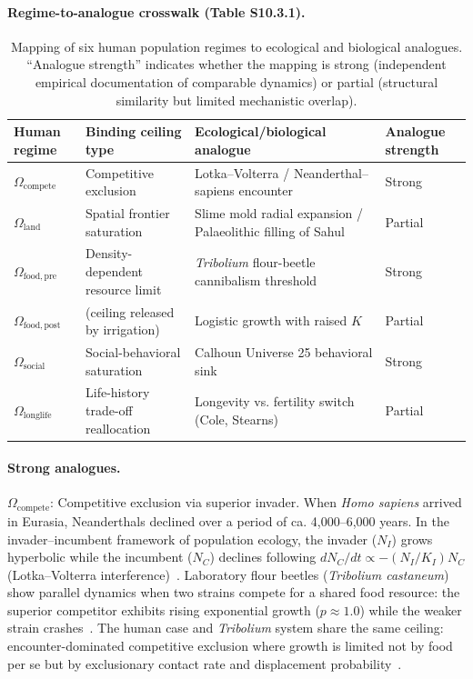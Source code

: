 \documentclass[11pt]{article}
\begin{document}
\paragraph{Regime-to-analogue crosswalk (Table S10.3.1).}
\begin{table}[H]
\centering
\caption{Mapping of six human population regimes to ecological and biological analogues. ``Analogue strength''
indicates whether the mapping is strong (independent empirical documentation of comparable dynamics) or
partial (structural similarity but limited mechanistic overlap).}
\label{tab:S10_analogues}
\begin{tabular}{llll}
\toprule
Human regime & Binding ceiling type & Ecological/biological analogue & Analogue strength \\
\midrule
$\Omega_{\mathrm{compete}}$ & Competitive exclusion & Lotka--Volterra / Neanderthal--sapiens encounter & Strong \\
$\Omega_{\mathrm{land}}$ & Spatial frontier saturation & Slime mold radial expansion / Palaeolithic filling of Sahul & Partial \\
$\Omega_{\mathrm{food,pre}}$ & Density-dependent resource limit & \textit{Tribolium} flour-beetle cannibalism threshold & Strong \\
$\Omega_{\mathrm{food,post}}$ & (ceiling released by irrigation) & Logistic growth with raised $K$ & Partial \\
$\Omega_{\mathrm{social}}$ & Social-behavioral saturation & Calhoun Universe 25 behavioral sink & Strong \\
$\Omega_{\mathrm{longlife}}$ & Life-history trade-off reallocation & Longevity vs. fertility switch (Cole, Stearns) & Partial \\
\bottomrule
\end{tabular}
\end{table}

\paragraph{Strong analogues.}

$\Omega_{\mathrm{compete}}$: Competitive exclusion via superior invader.
When \textit{Homo sapiens} arrived in Eurasia, Neanderthals declined over a period of ca. 4,000--6,000 years.
In the invader--incumbent framework of population ecology, the invader ($N_I$) grows hyperbolic while the incumbent
($N_C$) declines following $dN_C/dt \propto -(N_I/K_I)N_C$ (Lotka--Volterra interference)~\cite{currat2004,lotka1925,volterra1926}.
Laboratory flour beetles (\textit{Tribolium castaneum}) show parallel dynamics when two strains compete
for a shared food resource: the superior competitor exhibits rising exponential growth ($p \approx 1.0$) while
the weaker strain crashes~\cite{park1948,crombie1946}.
The human case and \textit{Tribolium} system share the same ceiling: encounter-dominated competitive
exclusion where growth is limited not by food per se but by exclusionary contact rate and displacement
probability~\cite{park1954}.
\end{document}
